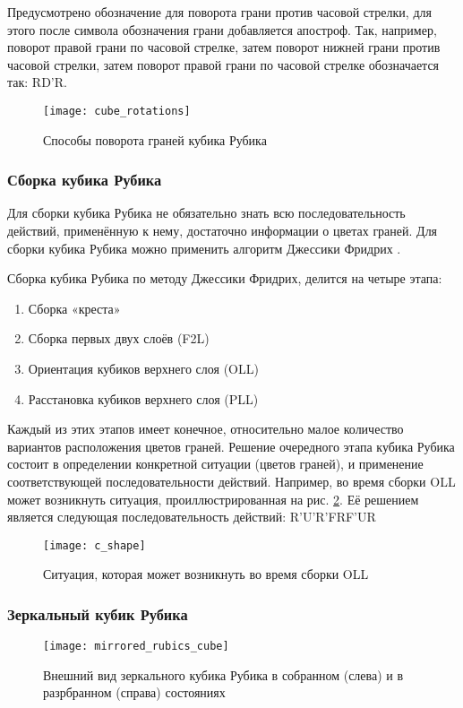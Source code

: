 Предусмотрено обозначение для поворота грани против часовой стрелки, для этого после символа обозначения грани добавляется апостроф. Так, например, поворот правой грани по часовой стрелке, затем поворот нижней грани против часовой стрелки, затем поворот правой грани по часовой стрелке обозначается так: RD’R.

\begin{figure}[ht]
	\centering
	\texttt{[image: cube\_rotations]}
	\caption{Способы поворота граней кубика Рубика}
	\label{fig:cube_rotations}
\end{figure}

\subsubsection{Сборка кубика Рубика}
Для сборки кубика Рубика не обязательно знать всю последовательность действий, применённую к нему, достаточно информации о цветах граней. Для сборки кубика Рубика можно применить алгоритм Джессики Фридрих \cite{bib:fridrich}.

Сборка кубика Рубика по методу Джессики Фридрих, делится на четыре этапа:
\begin{enumerate}
	\item Сборка «креста»
	\item Сборка первых двух слоёв (F2L)
	\item Ориентация кубиков верхнего слоя (OLL)
	\item Расстановка кубиков верхнего слоя (PLL)
\end{enumerate}

Каждый из этих этапов имеет конечное, относительно малое количество вариантов расположения цветов граней. Решение очередного этапа кубика Рубика состоит в определении конкретной ситуации (цветов граней), и применение соответствующей последовательности действий. Например, во время сборки OLL может возникнуть ситуация, проиллюстрированная на рис. \ref{fig:c_shape}. Её решением является следующая последовательность действий: R'U'R'FRF'UR

\begin{figure}[ht]
	\centering
	\texttt{[image: c\_shape]}
	\caption{Ситуация, которая может возникнуть во время сборки OLL}
	\label{fig:c_shape}
\end{figure}

\subsubsection{Зеркальный кубик Рубика}
\begin{figure}[ht]
	\centering
	\texttt{[image: mirrored\_rubics\_cube]}
	\caption{Внешний вид зеркального кубика Рубика в собранном (слева) и в разрбранном (справа) состояниях}
	\label{fig:mirrored_cube}
\end{figure}


